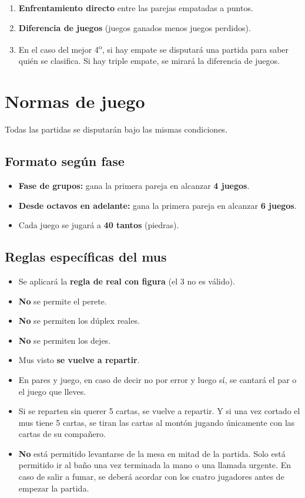 \documentclass[11pt,a4paper]{article}
\begin{document}
\begin{enumerate}
    \item \textbf{Enfrentamiento directo} entre las parejas empatadas a puntos.
    \item \textbf{Diferencia de juegos} (juegos ganados menos juegos perdidos).
    \item En el caso del mejor 4\textsuperscript{o}, si hay empate se disputará una partida para saber quién se clasifica. Si hay triple empate, se mirará la diferencia de juegos.
\end{enumerate}

\section{Normas de juego}

Todas las partidas se disputarán bajo las mismas condiciones.

\subsection{Formato según fase}

\begin{itemize}
    \item \textbf{Fase de grupos:} gana la primera pareja en alcanzar \textbf{4 juegos}.
    \item \textbf{Desde octavos en adelante:} gana la primera pareja en alcanzar \textbf{6 juegos}.
    \item Cada juego se jugará a \textbf{40 tantos} (piedras).
\end{itemize}

\subsection{Reglas específicas del mus}

\begin{itemize}
    \item Se aplicará la \textbf{regla de real con figura} (el 3 no es válido).
    \item \textbf{No} se permite el perete.
    \item \textbf{No} se permiten los dúplex reales.
    \item \textbf{No} se permiten los dejes.
    \item Mus visto \textbf{se vuelve a repartir}.
    \item En pares y juego, en caso de decir no por error y luego sí, se cantará el par o el juego que lleves.
    \item Si se reparten sin querer 5 cartas, se vuelve a repartir. Y si una vez cortado el mus tiene 5 cartas, se tiran las cartas al montón jugando únicamente con las cartas de su compañero.
    \item \textbf{No} está permitido levantarse de la mesa en mitad de la partida. Solo está permitido ir al baño una vez terminada la mano o una llamada urgente. En caso de salir a fumar, se deberá acordar con los cuatro jugadores antes de empezar la partida.
\end{itemize}
\end{document}
